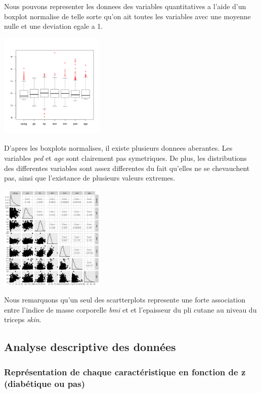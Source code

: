 \documentclass[10pt]{article}
\begin{document}
Nous pouvons representer les donnees des variables quantitatives a l'aide d'un boxplot normalise de telle sorte qu'on ait toutes les variables avec une moyenne nulle et une deviation egale a 1.
\begin{center}
	\includegraphics[width=50mm]{Figures/Pima/boxplot_norm_Pimaquant.png}
	\label{fig:boxplot_norm_pima_quantitatives}
\end{center}
D'apres les boxplots normalises, il existe plusieurs donnees aberantes. Les variables \textit{ped} et \textit{age} sont clairement pas symetriques. De plus, les distributions des differentes variables sont assez differentes du fait qu'elles ne se chevauchent pas, ainsi que l'existance de plusieurs valeurs extremes.
\begin{center}
	\includegraphics[width=50mm]{Figures/Pima/plot_Pimaquant.png}
	\label{fig:plot_pima_quantitatives}
\end{center}

Nous remarquons qu'un seul des scartterplots represente une forte association entre l'indice de masse corporelle \textit{bmi} et et l'epaisseur du pli cutane au niveau du triceps \textit{skin}.
\subsection{Analyse descriptive des données}

\subsubsection{Représentation de chaque caractéristique en fonction de z (diabétique ou pas)}
\end{document}
